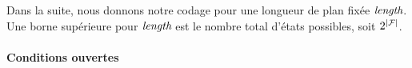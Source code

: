 


Dans la suite, nous donnons notre codage pour une longueur de plan fix\'{e}e $\textit{length}$. Une borne sup\'{e}rieure pour $\textit{length}$ est le nombre total d'\'{e}tats possibles, soit $2^{\mid\mathcal{F}\mid}$.

\paragraph*{Conditions ouvertes}

